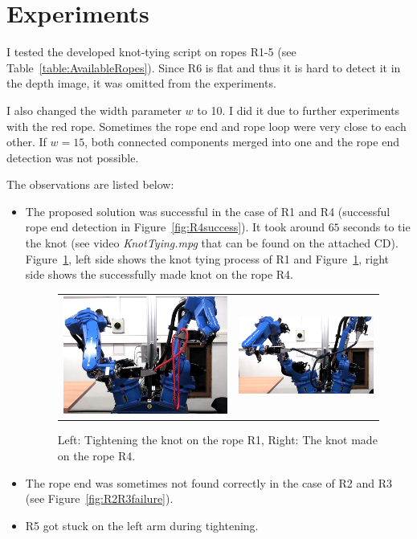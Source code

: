     \section{Experiments}
        I tested the developed knot-tying script on ropes R1-5 (see Table~\ref{table:AvailableRopes}). Since R6 is flat and thus it is hard to detect it in the depth image, it was omitted from the experiments.

        I also changed the width parameter $w$ to 10. I did it due to further experiments with the red rope. Sometimes the rope end and rope loop were very close to each other. If $w=15$, both connected components merged into one and the rope end detection was not possible.

       The observations are listed below:
%
        \begin{itemize}\itemsep 0pt
            \item The proposed solution was successful in the case of R1 and R4 (successful rope end detection in Figure~\ref{fig:R4success}). It took around $65$ seconds to tie the knot (see video \textit{KnotTying.mpg} that can be found on the attached CD). Figure~\ref{fig:R1R4KnotTightening}, left side shows the knot tying process of R1 and Figure~\ref{fig:R1R4KnotTightening}, right side shows the successfully made knot on the rope R4.

            \begin{figure}
                \centering
                \begin{tabular}{cc}
                \includegraphics[height=0.3\textwidth]{R1KnotTightening.png}
                &
                \includegraphics[height=0.3\textwidth]{R4KnotTightening.png}

                \end{tabular}
                \caption{Left: Tightening the knot on the rope R1, Right: The knot made on the rope R4.}
                \label{fig:R1R4KnotTightening}
            \end{figure}

            \item The rope end was sometimes not found correctly in the case of R2 and R3 (see Figure~\ref{fig:R2R3failure}).
            \item R5 got stuck on the left arm during tightening.
        \end{itemize}


